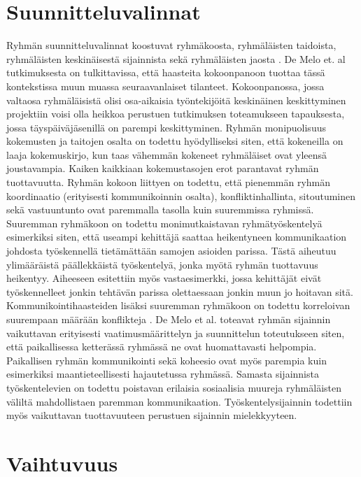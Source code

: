 \section{Suunnitteluvalinnat}

Ryhmän suunnitteluvalinnat koostuvat ryhmäkoosta, ryhmäläisten taidoista, ryhmäläisten keskinäisestä sijainnista sekä ryhmäläisten jaosta \cite{DEOMELO2013412}. De Melo et. al \cite{DEOMELO2013412} tutkimuksesta on tulkittavissa, että haasteita kokoonpanoon tuottaa tässä kontekstissa muun muassa seuraavanlaiset tilanteet. Kokoonpanossa, jossa valtaosa ryhmäläisistä olisi osa-aikaisia työntekijöitä keskinäinen keskittyminen projektiin voisi olla heikkoa perustuen tutkimuksen toteamukseen tapauksesta, jossa täyspäiväjäsenillä on parempi keskittyminen. Ryhmän monipuolisuus kokemusten ja taitojen osalta on todettu hyödylliseksi siten, että kokeneilla on laaja kokemuskirjo, kun taas vähemmän kokeneet ryhmäläiset ovat yleensä joustavampia. Kaiken kaikkiaan kokemustasojen erot parantavat ryhmän tuottavuutta. Ryhmän kokoon liittyen on todettu, että pienemmän ryhmän koordinaatio (erityisesti kommunikoinnin osalta), konfliktinhallinta, sitoutuminen sekä vastuuntunto ovat paremmalla tasolla kuin suuremmissa ryhmissä. Suuremman ryhmäkoon on todettu monimutkaistavan ryhmätyöskentelyä esimerkiksi siten, että useampi kehittäjä saattaa heikentyneen kommunikaation johdosta työskennellä tietämättään samojen asioiden parissa. Tästä aiheutuu ylimääräistä päällekkäistä työskentelyä, jonka myötä ryhmän tuottavuus heikentyy. Aiheeseen esitettiin myös vastaesimerkki, jossa kehittäjät eivät työskennelleet jonkin tehtävän parissa olettaessaan jonkin muun jo hoitavan sitä. Kommunikointihaasteiden lisäksi suuremman ryhmäkoon on todettu korreloivan suurempaan määrään konflikteja \cite{DEOMELO2013412, SELLERISILVA201520}. De Melo et al. \cite{DEOMELO2013412} toteavat ryhmän sijainnin vaikuttavan erityisesti vaatimusmäärittelyn ja suunnittelun toteutukseen siten, että paikallisessa ketterässä ryhmässä ne ovat huomattavasti helpompia. Paikallisen ryhmän kommunikointi sekä koheesio ovat myös parempia kuin esimerkiksi maantieteellisesti hajautetussa ryhmässä. Samasta sijainnista työskentelevien on todettu poistavan erilaisia sosiaalisia muureja ryhmäläisten väliltä mahdollistaen paremman kommunikaation. Työskentelysijainnin todettiin myös vaikuttavan tuottavuuteen perustuen sijainnin mielekkyyteen.

\section{Vaihtuvuus}

